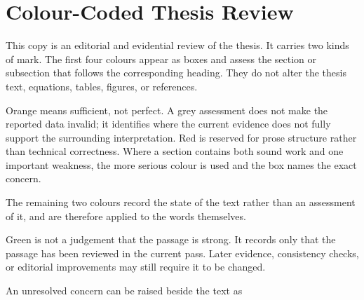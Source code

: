 \chapter*{Colour-Coded Thesis Review}

This copy is an editorial and evidential review of the thesis. It carries two
kinds of mark. The first four colours appear as boxes and assess the section or
subsection that follows the corresponding heading. They do not alter the thesis
text, equations, tables, figures, or references.


Orange means sufficient, not perfect. A grey assessment does not make the
reported data invalid; it identifies where the current evidence does not fully
support the surrounding interpretation. Red is reserved for prose structure
rather than technical correctness. Where a section contains both sound work
and one important weakness, the more serious colour is used and the box names
the exact concern.

The remaining two colours record the state of the text rather than an
assessment of it, and are therefore applied to the words themselves.


Green is not a judgement that the passage is strong. It records only that the
passage has been reviewed in the current pass. Later evidence, consistency
checks, or editorial improvements may still require it to be changed.

An unresolved concern can be raised beside the text as

